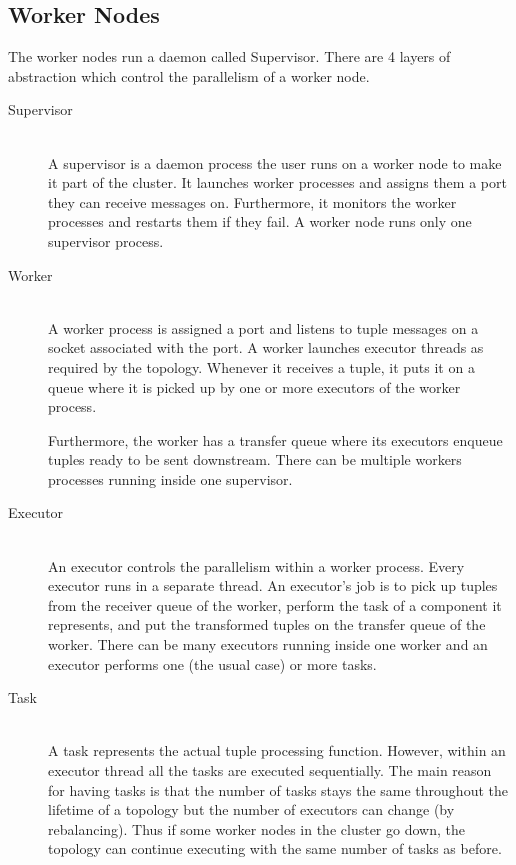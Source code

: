 \documentclass[bsc,logo,frontabs,twoside,singlespacing,normalheadings,parskip]{infthesis}     %
\let\Oldtodo\todo
\renewcommand{\todo}[1]{\Oldtodo[inline]{#1}}
\begin{document}

\subsection{Worker Nodes}

The worker nodes run a daemon called Supervisor. There are 4 layers of abstraction which control the parallelism of a worker node.

\begin{description}
	\item[Supervisor] \hfill \\
	A supervisor is a daemon process the user runs on a worker node to make it part of the cluster. It launches worker processes and assigns them a port they can receive messages on. Furthermore, it monitors the worker processes and restarts them if they fail. A worker node runs only one supervisor process.
	\item[Worker] \hfill \\
	A worker process is assigned a port and listens to tuple messages on a socket associated with the port. A worker launches executor threads as required by the topology. Whenever it receives a tuple, it puts it on a queue where it is picked up by one or more executors of the worker process.
	
	Furthermore, the worker has a transfer queue where its executors enqueue tuples ready to be sent downstream. There can be multiple workers processes running inside one supervisor.
	\item[Executor] \hfill \\
	An executor controls the parallelism within a worker process. Every executor runs in a separate thread. An executor's job is to pick up tuples from the receiver queue of the worker, perform the task of a component it represents, and put the transformed tuples on the transfer queue of the worker. There can be many executors running inside one worker and an executor performs one (the usual case) or more tasks.
	\item[Task] \hfill \\
	A task represents the actual tuple processing function. However, within an executor thread all the tasks are executed sequentially. The main reason for having tasks is that the number of tasks stays the same throughout the lifetime of a topology but the number of executors can change (by rebalancing). Thus if some worker nodes in the cluster go down, the topology can continue executing with the same number of tasks as before.
\end{description}
\end{document}
